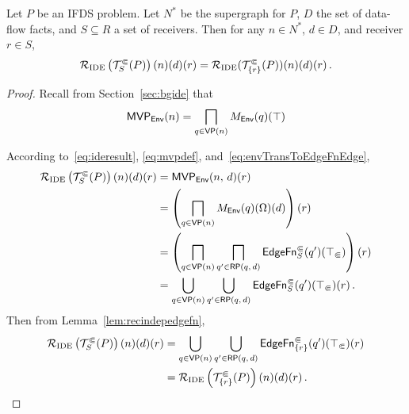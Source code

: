 \begin{lemma}\label{lem:recindep} Let $P$ be an IFDS problem. Let $N^*$ be the supergraph for $P$, $D$ the set of data-flow facts, and $S\subseteq R$ a set of receivers.
  Then for any $n\in N^*$, $d\in D$, and receiver $r\in S$,
  \begin{equation}
    \mathcal R_{\text{IDE}}\left(\mathcal T^\Subset_S(P)\right)(n)(d)(r)=
    \mathcal R_{\text{IDE}}(\mathcal T^\Subset_{\{r\}}(P))(n)(d)(r)\,.
  \end{equation}
\end{lemma}
\begin{proof} Recall from Section~\ref{sec:bgide} that
\begin{equation}\label{eq:mvpdef}
  \textsf{MVP}_{\textsf{Env}}(n)=\bigsqcap_{q\in\textsf{VP}(n)}M_\textsf{Env}(q)(\top)
\end{equation}

  According to~\eqref{eq:ideresult}, \eqref{eq:mvpdef}, and~\eqref{eq:envTransToEdgeFnEdge},
  \begin{align}
    \mathcal R_{\text{IDE}}\left(\mathcal T^\Subset_S(P)\right)(n)(d)(r)
    &=\textsf{MVP}_{\textsf{Env}}(n,\,d)(r)\notag\\
    &=\left(\bigsqcap_{q\in\textsf{VP}(n)}M_\textsf{Env}(q)(\Omega)(d)\right)(r)\notag\\
    &=\left(\bigsqcap_{q\in\textsf{VP}(n)}\bigsqcap_{q'\in\mathsf{RP}(q,\,d)}\textsf{EdgeFn}^\Subset_{S}(q')(\top_\Subset)\right)(r)\notag\\
    &=\bigcup_{q\in\textsf{VP}(n)}\bigcup_{q'\in\mathsf{RP}(q,\,d)}\textsf{EdgeFn}^\Subset_{S}(q')(\top_\Subset)(r)\,.\label{eq:resultThroughEdgefn}
  \end{align}
  Then from Lemma~\ref{lem:recindepedgefn},
  \begin{align*}
    \mathcal R_{\text{IDE}}\left(\mathcal T^\Subset_S(P)\right)(n)(d)(r)
    &=\bigcup_{q\in\textsf{VP}(n)}\bigcup_{q'\in\mathsf{RP}(q,\,d)}\textsf{EdgeFn}^\Subset_{\{r\}}(q')(\top_\Subset)(r)\\
    &=\mathcal R_{\text{IDE}}\left(\mathcal T^\Subset_{\{r\}}(P)\right)(n)(d)(r)\,.\qedhere
  \end{align*}
\end{proof}

